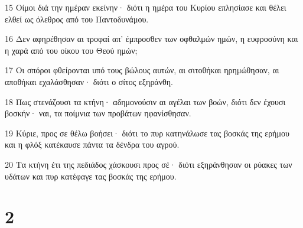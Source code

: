 \par 15 Οίμοι διά την ημέραν εκείνην· διότι η ημέρα του Κυρίου επλησίασε και θέλει ελθεί ως όλεθρος από του Παντοδυνάμου.
\par 16 Δεν αφηρέθησαν αι τροφαί απ' έμπροσθεν των οφθαλμών ημών, η ευφροσύνη και η χαρά από του οίκου του Θεού ημών;
\par 17 Οι σπόροι φθείρονται υπό τους βώλους αυτών, αι σιτοθήκαι ηρημώθησαν, αι αποθήκαι εχαλάσθησαν· διότι ο σίτος εξηράνθη.
\par 18 Πως στενάζουσι τα κτήνη· αδημονούσιν αι αγέλαι των βοών, διότι δεν έχουσι βοσκήν· ναι, τα ποίμνια των προβάτων ηφανίσθησαν.
\par 19 Κύριε, προς σε θέλω βοήσει· διότι το πυρ κατηνάλωσε τας βοσκάς της ερήμου και η φλόξ κατέκαυσε πάντα τα δένδρα του αγρού.
\par 20 Τα κτήνη έτι της πεδιάδος χάσκουσι προς σέ· διότι εξηράνθησαν οι ρύακες των υδάτων και πυρ κατέφαγε τας βοσκάς της ερήμου.

\chapter{2}

